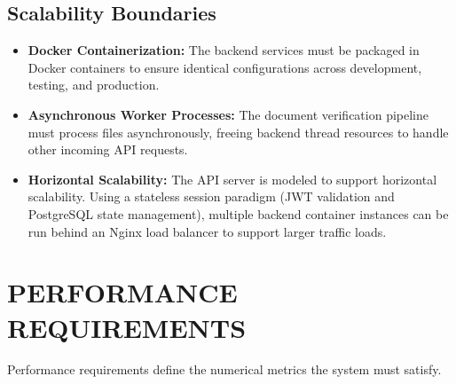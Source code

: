 \documentclass[12,Times new Roman,a4paper]{report}
\begin{document}
\subsection{Scalability Boundaries}
\begin{itemize}
    \item \textbf{Docker Containerization:} The backend services must be packaged in Docker containers to ensure identical configurations across development, testing, and production.
    \item \textbf{Asynchronous Worker Processes:} The document verification pipeline must process files asynchronously, freeing backend thread resources to handle other incoming API requests.
    \item \textbf{Horizontal Scalability:} The API server is modeled to support horizontal scalability. Using a stateless session paradigm (JWT validation and PostgreSQL state management), multiple backend container instances can be run behind an Nginx load balancer to support larger traffic loads.
\end{itemize}

\section{PERFORMANCE REQUIREMENTS}
Performance requirements define the numerical metrics the system must satisfy.

\begin{table}[htbp]
\centering
\caption{NoteHub Target Performance Metrics}
\label{tab:perf_metrics}
\end{table}
\end{document}
